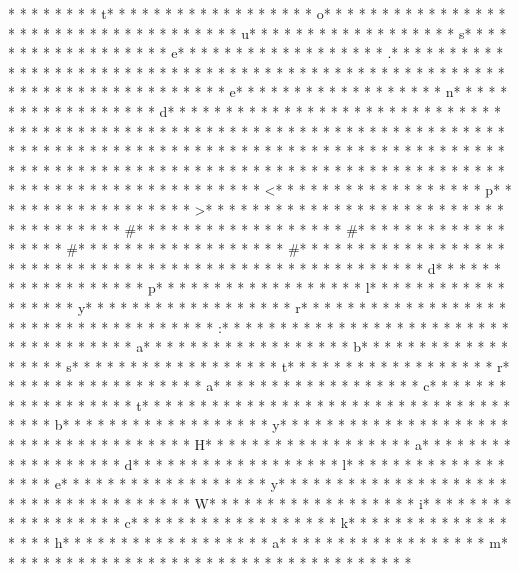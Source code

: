 * * *  *  * * *  * t* * *  * * *  * * *  *  * * *  *  * * *  * o* * *  * * *  * * *  *  * * *  *  * * *  *  * * *  * * *  * * *  *  * * *  *  * * *  * u* * *  * * *  * * *  *  * * *  *  * * *  * s* * *  * * *  * * *  *  * * *  *  * * *  * e* * *  * * *  * * *  *  * * *  *  * * *  * .* * *  * * *  * * *  *  * * *  *  * * *  *  * * *  * * *  * * *  *  * * *  *  * * *  * 
* * *  * * *  * * *  *  * * *  *  * * *  * 	* * *  * * *  * * *  *  * * *  *  * * *  * e* * *  * * *  * * *  *  * * *  *  * * *  * n* * *  * * *  * * *  *  * * *  *  * * *  * d* * *  * * *  * * *  *  * * *  *  * * *  * {* * *  * * *  * * *  *  * * *  *  * * *  *  * * *  * * *  * * *  *  * * *  *  * * *  * }* * *  * * *  * * *  *  * * *  *  * * *  * 
* * *  * * *  * * *  *  * * *  *  * * *  * 	* * *  * * *  * * *  *  * * *  *  * * *  * 
* * *  * * *  * * *  *  * * *  *  * * *  * 	* * *  * * *  * * *  *  * * *  *  * * *  * 
* * *  * * *  * * *  *  * * *  *  * * *  * 	* * *  * * *  * * *  *  * * *  *  * * *  * <* * *  * * *  * * *  *  * * *  *  * * *  * p* * *  * * *  * * *  *  * * *  *  * * *  * >* * *  * * *  * * *  *  * * *  *  * * *  * 
* * *  * * *  * * *  *  * * *  *  * * *  * #* * *  * * *  * * *  *  * * *  *  * * *  * #* * *  * * *  * * *  *  * * *  *  * * *  * #* * *  * * *  * * *  *  * * *  *  * * *  * #* * *  * * *  * * *  *  * * *  *  * * *  *  * * *  * * *  * * *  *  * * *  *  * * *  * {* * *  * * *  * * *  *  * * *  *  * * *  * d* * *  * * *  * * *  *  * * *  *  * * *  * p* * *  * * *  * * *  *  * * *  *  * * *  * l* * *  * * *  * * *  *  * * *  *  * * *  * y* * *  * * *  * * *  *  * * *  *  * * *  * r* * *  * * *  * * *  *  * * *  *  * * *  *  * * *  * * *  * * *  *  * * *  *  * * *  * :* * *  * * *  * * *  *  * * *  *  * * *  *  * * *  * * *  * * *  *  * * *  *  * * *  * a* * *  * * *  * * *  *  * * *  *  * * *  * b* * *  * * *  * * *  *  * * *  *  * * *  * s* * *  * * *  * * *  *  * * *  *  * * *  * t* * *  * * *  * * *  *  * * *  *  * * *  * r* * *  * * *  * * *  *  * * *  *  * * *  * a* * *  * * *  * * *  *  * * *  *  * * *  * c* * *  * * *  * * *  *  * * *  *  * * *  * t* * *  * * *  * * *  *  * * *  *  * * *  *  * * *  * * *  * * *  *  * * *  *  * * *  * b* * *  * * *  * * *  *  * * *  *  * * *  * y* * *  * * *  * * *  *  * * *  *  * * *  *  * * *  * * *  * * *  *  * * *  *  * * *  * H* * *  * * *  * * *  *  * * *  *  * * *  * a* * *  * * *  * * *  *  * * *  *  * * *  * d* * *  * * *  * * *  *  * * *  *  * * *  * l* * *  * * *  * * *  *  * * *  *  * * *  * e* * *  * * *  * * *  *  * * *  *  * * *  * y* * *  * * *  * * *  *  * * *  *  * * *  *  * * *  * * *  * * *  *  * * *  *  * * *  * W* * *  * * *  * * *  *  * * *  *  * * *  * i* * *  * * *  * * *  *  * * *  *  * * *  * c* * *  * * *  * * *  *  * * *  *  * * *  * k* * *  * * *  * * *  *  * * *  *  * * *  * h* * *  * * *  * * *  *  * * *  *  * * *  * a* * *  * * *  * * *  *  * * *  *  * * *  * m* * *  * * *  * * *  *  * * *  *  * * *  * }* * *  * * *  * * *  *  * * *  *  * * *  * 
